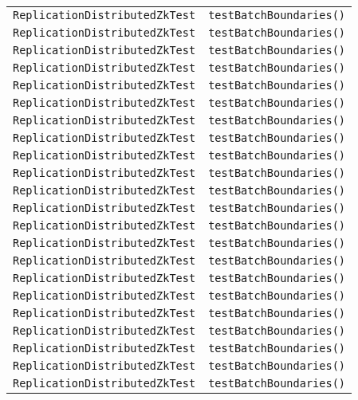 \begin{center}
\begin{longtable}{ll}
\lstinline/ReplicationDistributedZkTest/&{\lstinline/testBatchBoundaries()/}\\
\lstinline/ReplicationDistributedZkTest/&{\lstinline/testBatchBoundaries()/}\\
\lstinline/ReplicationDistributedZkTest/&{\lstinline/testBatchBoundaries()/}\\
\lstinline/ReplicationDistributedZkTest/&{\lstinline/testBatchBoundaries()/}\\
\lstinline/ReplicationDistributedZkTest/&{\lstinline/testBatchBoundaries()/}\\
\lstinline/ReplicationDistributedZkTest/&{\lstinline/testBatchBoundaries()/}\\
\lstinline/ReplicationDistributedZkTest/&{\lstinline/testBatchBoundaries()/}\\
\lstinline/ReplicationDistributedZkTest/&{\lstinline/testBatchBoundaries()/}\\
\lstinline/ReplicationDistributedZkTest/&{\lstinline/testBatchBoundaries()/}\\
\lstinline/ReplicationDistributedZkTest/&{\lstinline/testBatchBoundaries()/}\\
\lstinline/ReplicationDistributedZkTest/&{\lstinline/testBatchBoundaries()/}\\
\lstinline/ReplicationDistributedZkTest/&{\lstinline/testBatchBoundaries()/}\\
\lstinline/ReplicationDistributedZkTest/&{\lstinline/testBatchBoundaries()/}\\
\lstinline/ReplicationDistributedZkTest/&{\lstinline/testBatchBoundaries()/}\\
\lstinline/ReplicationDistributedZkTest/&{\lstinline/testBatchBoundaries()/}\\
\lstinline/ReplicationDistributedZkTest/&{\lstinline/testBatchBoundaries()/}\\
\lstinline/ReplicationDistributedZkTest/&{\lstinline/testBatchBoundaries()/}\\
\lstinline/ReplicationDistributedZkTest/&{\lstinline/testBatchBoundaries()/}\\
\lstinline/ReplicationDistributedZkTest/&{\lstinline/testBatchBoundaries()/}\\
\lstinline/ReplicationDistributedZkTest/&{\lstinline/testBatchBoundaries()/}\\
\lstinline/ReplicationDistributedZkTest/&{\lstinline/testBatchBoundaries()/}\\
\lstinline/ReplicationDistributedZkTest/&{\lstinline/testBatchBoundaries()/}\\

\end{longtable}
\end{center}
